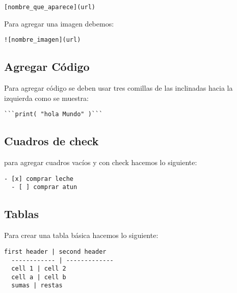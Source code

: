 \begin{lstlisting}[numbers=none]
  [nombre_que_aparece](url)
\end{lstlisting}

Para agregar una imagen debemos:


\begin{lstlisting}[numbers=none]
  ![nombre_imagen](url)
\end{lstlisting}

\subsection{Agregar C\'odigo}

Para agregar c\'odigo se deben usar tres comillas de las inclinadas hacia la izquierda como se muestra:

\begin{lstlisting}[numbers=none]
  ```print( "hola Mundo" )```
\end{lstlisting}

\subsection{Cuadros de check}
para agregar cuadros vac\'ios y con check hacemos lo siguiente:


\begin{lstlisting}[numbers=none]
  - [x] comprar leche
  - [ ] comprar atun
\end{lstlisting}

\subsection{Tablas}

Para crear una tabla b\'asica hacemos lo siguiente:

\begin{lstlisting}[numbers=none]
  first header | second header
  ------------ | -------------
  cell 1 | cell 2
  cell a | cell b
  sumas | restas
\end{lstlisting}
